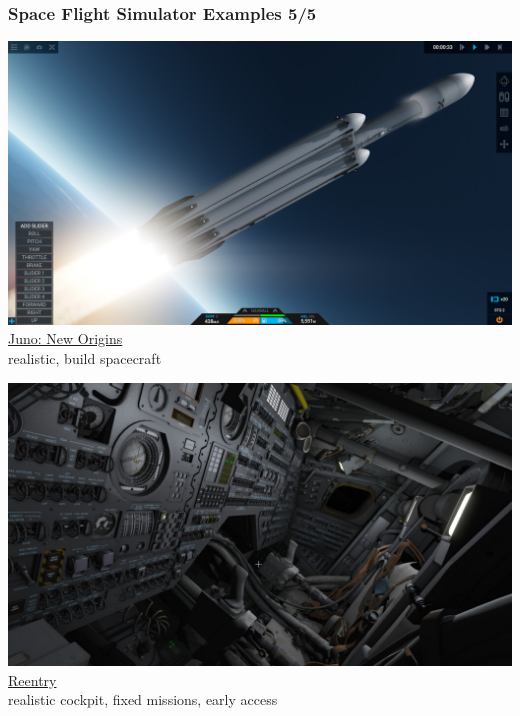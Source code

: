 \documentclass[aspectratio=169,11pt,xcolor=dvipsnames]{beamer}
\begin{document}
\begin{frame}
  \frametitle{Space Flight Simulator Examples 5/5}
  \begin{minipage}[t]{0.49\textwidth}
    \begin{center}
      \includegraphics[width=\textwidth]{juno}\\
      \href{https://www.simplerockets.com/}{Juno: New Origins}\\
      realistic, build spacecraft
    \end{center}
  \end{minipage}
  \begin{minipage}[t]{0.49\textwidth}
    \begin{center}
      \includegraphics[width=\textwidth]{reentry}\\
      \href{https://reentrygame.com/}{Reentry}\\
      realistic cockpit, fixed missions, early access
    \end{center}
  \end{minipage}
\end{frame}
\end{document}

